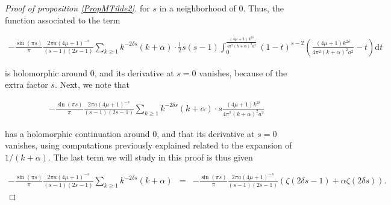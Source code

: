 \documentclass{jams-l}
\theoremstyle{definition}
\theoremstyle{remark}
\numberwithin{equation}{section}
\begin{document}
\begin{proof}[Proof of proposition \ref{PropMTilde2}]
                        \noindent for $s$ in a neighborhood of $0$. Thus, the function associated to the term
                        
                        \[ \begin{array}{c}
                                \scriptstyle - \frac{\sin \left( \pi s \right)}{\pi} \frac{2 \pi a \left( 4 \mu + 1 \right)^{-s}}{\left( s-1 \right) \left( 2s-1 \right)} \sum\limits_{k \geqslant 1} k^{- 2 \delta s} \left( k + \alpha \right) \cdot \frac{1}{2} s \left( s-1 \right) \int_0^{\frac{\left( 4 \mu + 1 \right) k^{2 \delta}}{4 \pi^2 \left( k + \alpha \right)^2 a^2}} \left( 1-t \right)^{s-2} \left( \frac{\left( 4 \mu + 1 \right) k^{2 \delta}}{4 \pi^2 \left( k + \alpha \right)^2 a^2} - t \right) \mathrm{d}t
                            \end{array} \]
                        
                        \noindent is holomorphic around $0$, and its derivative at $s=0$ vanishes, because of the extra factor $s$. Next, we note that
                        
                        \[ \begin{array}{c}
                                - \frac{\sin \left( \pi s \right)}{\pi} \frac{2 \pi a \left( 4 \mu + 1 \right)^{-s}}{\left( s-1 \right) \left( 2s-1 \right)} \sum\limits_{k \geqslant 1} k^{- 2 \delta s} \left( k + \alpha \right) \cdot s \frac{\left( 4 \mu + 1 \right) k^{2 \delta}}{4 \pi^2 \left( k + \alpha \right)^2 a^2}
                            \end{array} \]
                        
                        \noindent has a holomorphic continuation around $0$, and that its derivative at $s=0$ vanishes, using computations previously explained related to the expansion of $1/\left( k + \alpha \right)$. The last term we will study in this proof is thus given
                        
                        \[ \begin{array}{lll}
                                \scriptstyle - \frac{\sin \left( \pi s \right)}{\pi} \frac{2 \pi a \left( 4 \mu + 1 \right)^{-s}}{\left( s-1 \right) \left( 2s-1 \right)} \sum\limits_{k \geqslant 1} k^{- 2 \delta s} \left( k + \alpha \right) & \scriptstyle = & \scriptstyle - \frac{\sin \left( \pi s \right)}{\pi} \frac{2 \pi a \left( 4 \mu + 1 \right)^{-s}}{\left( s-1 \right) \left( 2s-1 \right)} \left( \zeta \left( 2 \delta s - 1 \right) + \alpha \zeta \left( 2 \delta s \right) \right).
                            \end{array} \]
                        

\end{proof}
\end{document}
